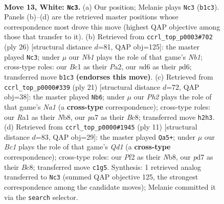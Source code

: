 \documentclass[11pt]{article}
\begin{document}
\clearpage

\begin{figure}[p]\centering
\begin{subfigure}{0.46\textwidth}\centering
\resizebox{\linewidth}{!}{%
\newchessgame
\chessboard[
  setfen={r1bq2k1/pppp1ppp/3n4/3P4/3b4/8/PPP2PPP/RNB1QBK1 w - - 1 13},
  showmover=false,
  pgfstyle=straightmove, color=movearrow, markmove={b1-c3}
]}
\caption{}
\end{subfigure}\hfill
\begin{subfigure}{0.46\textwidth}\centering
\resizebox{\linewidth}{!}{%
\newchessgame
\chessboard[
  setfen={r1bq2k1/pp1p1ppp/3p4/8/3b4/8/PPP2PPP/RN2QBK1 w - - 0 14},
  showmover=false,
  pgfstyle=straightmove, color=movearrow, markmove={b1-c3}
]}
\caption{}
\end{subfigure}
\\[4pt]
\begin{subfigure}{0.46\textwidth}\centering
\resizebox{\linewidth}{!}{%
\newchessgame
\chessboard[
  setfen={nnbqkb1r/2p2ppp/4p3/1N2P3/2pP4/4BN2/1P3PPP/3QKB1R b Kk - 0 11},
  showmover=false,
  pgfstyle=straightmove, color=movearrow, markmove={a8-b6}
]}
\caption{}
\end{subfigure}\hfill
\begin{subfigure}{0.46\textwidth}\centering
\resizebox{\linewidth}{!}{%
\newchessgame
\chessboard[
  setfen={rnbqkbnr/pp3ppp/8/4P3/3pN3/8/PP2PPPP/R1BQKBNR b KQkq - 1 6},
  showmover=false,
  pgfstyle=straightmove, color=movearrow, markmove={d8-a5}
]}
\caption{}
\end{subfigure}
\caption{\textbf{Move 13, White: \texttt{Nc3}.} (a) Our position; Melanie plays \texttt{Nc3} (\texttt{b1c3}). Panels (b)--(d) are the retrieved master positions whose correspondence most drove this move (highest QAP objective among those that transfer to it). (b) Retrieved from \texttt{ccrl\_top\_p0003\#702} (ply 26) [structural distance $d$=81, QAP obj=125]: the master played \texttt{Nc3}; under $\mu$ our \emph{Nb1} plays the role of that game's \emph{Nb1}; cross-type roles: our \emph{B}c1 as their \emph{P}a2, our \emph{n}d6 as their \emph{p}d6; transferred move \texttt{b1c3} \textbf{(endorses this move)}. (c) Retrieved from \texttt{ccrl\_top\_p0000\#339} (ply 21) [structural distance $d$=72, QAP obj=38]: the master played \texttt{Nb6}; under $\mu$ our \emph{Ph2} plays the role of that game's \emph{Na1} (a \textbf{cross-type} correspondence); cross-type roles: our \emph{R}a1 as their \emph{N}b8, our \emph{p}a7 as their \emph{B}c8; transferred move \texttt{h2h3}. (d) Retrieved from \texttt{ccrl\_top\_p0000\#1945} (ply 11) [structural distance $d$=83, QAP obj=29]: the master played \texttt{Qa5+}; under $\mu$ our \emph{Bc1} plays the role of that game's \emph{Qd1} (a \textbf{cross-type} correspondence); cross-type roles: our \emph{P}f2 as their \emph{N}b8, our \emph{p}d7 as their \emph{B}c8; transferred move \texttt{c1g5}. Synthesis: 1 retrieved analog transferred to \texttt{Nc3} (summed QAP objective 125, the strongest correspondence among the candidate moves); Melanie committed it via the \texttt{search} selector.}
\label{fig:thought-m24}
\end{figure}
\end{document}
